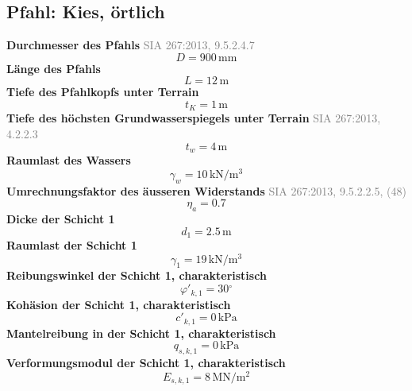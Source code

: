 \documentclass[11pt,a4paper]{article}
\newcommand{\normref}[1]{{\small\textcolor{gray}{#1}}}
\begin{document}
\subsection{Pfahl: Kies, örtlich}
\noindent\textbf{Durchmesser des Pfahls} \hfill \normref{SIA 267:2013, 9.5.2.4.7}
\begin{equation*}
D = 900\,\mathrm{mm}
\end{equation*}
\noindent\textbf{Länge des Pfahls}
\begin{equation*}
L = 12\,\mathrm{m}
\end{equation*}
\noindent\textbf{Tiefe des Pfahlkopfs unter Terrain}
\begin{equation*}
t_K = 1\,\mathrm{m}
\end{equation*}
\noindent\textbf{Tiefe des höchsten Grundwasserspiegels unter Terrain} \hfill \normref{SIA 267:2013, 4.2.2.3}
\begin{equation*}
t_w = 4\,\mathrm{m}
\end{equation*}
\noindent\textbf{Raumlast des Wassers}
\begin{equation*}
\gamma_w = 10\,\mathrm{kN}/\mathrm{m}^{3}
\end{equation*}
\noindent\textbf{Umrechnungsfaktor des äusseren Widerstands} \hfill \normref{SIA 267:2013, 9.5.2.2.5, (48)}
\begin{equation*}
\eta_a = 0.7
\end{equation*}
\noindent\textbf{Dicke der Schicht 1}
\begin{equation*}
d_{1} = 2.5\,\mathrm{m}
\end{equation*}
\noindent\textbf{Raumlast der Schicht 1}
\begin{equation*}
\gamma_{1} = 19\,\mathrm{kN}/\mathrm{m}^{3}
\end{equation*}
\noindent\textbf{Reibungswinkel der Schicht 1, charakteristisch}
\begin{equation*}
\varphi'_{k,1} = 30{}^{\circ}
\end{equation*}
\noindent\textbf{Kohäsion der Schicht 1, charakteristisch}
\begin{equation*}
c'_{k,1} = 0\,\mathrm{kPa}
\end{equation*}
\noindent\textbf{Mantelreibung in der Schicht 1, charakteristisch}
\begin{equation*}
q_{s,k,1} = 0\,\mathrm{kPa}
\end{equation*}
\noindent\textbf{Verformungsmodul der Schicht 1, charakteristisch}
\begin{equation*}
E_{s,k,1} = 8\,\mathrm{MN}/\mathrm{m}^{2}
\end{equation*}
\end{document}

